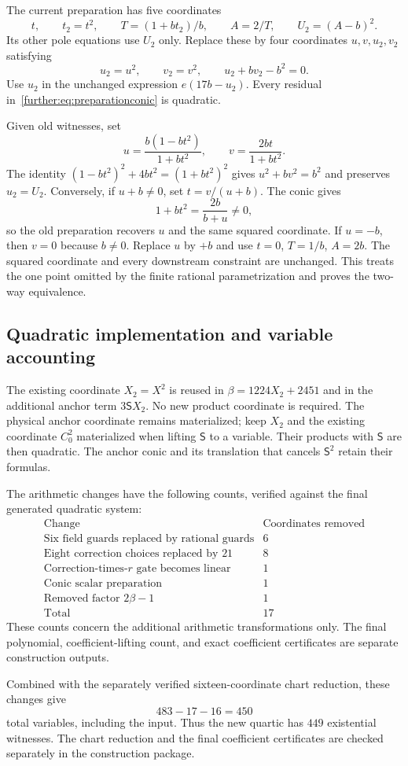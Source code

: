 The current preparation has five coordinates
\[
 t,\qquad t_2=t^2,\qquad T=(1+bt_2)/b,\qquad
 A=2/T,\qquad U_2=(A-b)^2.
\]
Its other pole equations use $U_2$ only. Replace these by four coordinates
$u,v,u_2,v_2$ satisfying
\begin{equation}\label{further:eq:preparationconic}
 u_2=u^2,\qquad v_2=v^2,\qquad
 u_2+bv_2-b^2=0.
\end{equation}
Use $u_2$ in the unchanged expression $e(17b-u_2)$.
Every residual in~\eqref{further:eq:preparationconic} is quadratic.

Given old witnesses, set
\[
 u=\frac{b(1-bt^2)}{1+bt^2},\qquad
 v=\frac{2bt}{1+bt^2}.
\]
The identity $(1-bt^2)^2+4bt^2=(1+bt^2)^2$ gives
$u^2+bv^2=b^2$ and preserves $u_2=U_2$.
Conversely, if $u+b\ne0$, set $t=v/(u+b)$. The conic gives
\[
 1+bt^2=\frac{2b}{b+u}\ne0,
\]
so the old preparation recovers $u$ and the same squared coordinate.
If $u=-b$, then $v=0$ because $b\ne0$. Replace $u$ by $+b$ and use
$t=0$, $T=1/b$, $A=2b$. The squared coordinate and every downstream
constraint are unchanged. This treats the one point omitted by the
finite rational parametrization and proves the two-way equivalence.

\subsection{Quadratic implementation and variable accounting}

The existing coordinate $X_2=X^2$ is reused in
$\beta=1224X_2+2451$ and in the additional anchor term
$3\mathsf S X_2$. No new product coordinate is required.
The physical anchor coordinate remains materialized; keep $X_2$ and the
existing coordinate $C_0^2$ materialized when lifting $\mathsf S$ to a
variable. Their products with $\mathsf S$ are then quadratic.
The anchor conic and its translation that cancels $\mathsf S^2$ retain
their formulas.

The arithmetic changes have the following counts, verified against the
final generated quadratic system:
\[
 \begin{array}{l|r}
 \text{Change}&\text{Coordinates removed}\\\hline
 \text{Six field guards replaced by rational guards}&6\\
 \text{Eight correction choices replaced by }21&8\\
 \text{Correction-times-}r\text{ gate becomes linear}&1\\
 \text{Conic scalar preparation}&1\\
 \text{Removed factor }2\beta-1&1\\\hline
 \text{Total}&17
 \end{array}
\]
These counts concern the additional arithmetic transformations only.
The final polynomial, coefficient-lifting count, and exact coefficient
certificates are separate construction outputs.


Combined with the separately verified sixteen-coordinate chart reduction,
these changes give
\[
 483-17-16=450
\]
total variables, including the input. Thus the new quartic has $449$
existential witnesses. The chart reduction and the final coefficient
certificates are checked separately in the construction package.
